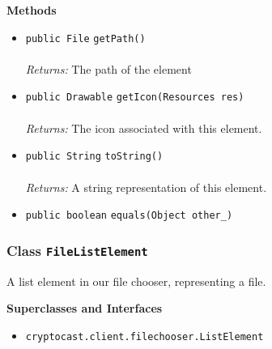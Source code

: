 \textbf{\sffamily Methods}
\begin{itemize}
\item \lstinline|public File| \lstinline|getPath|\lstinline|()|\\ \\[-0.6em]
\emph{Returns:} The path of the element



\item \lstinline|public Drawable| \lstinline|getIcon|\lstinline|(Resources res)|\\ \\[-0.6em]
\emph{Returns:} The icon associated with this element.



\item \lstinline|public String| \lstinline|toString|\lstinline|()|\\ \\[-0.6em]
\emph{Returns:} A string representation of this element.



\item \lstinline|public boolean| \lstinline|equals|\lstinline|(Object other_)| \\[-0.6em]




\end{itemize}

\subsubsection{Class \lstinline|FileListElement|}
A list element in our file chooser, representing a file. \\
\noindent\begin{minipage}[t]{5cm}
\vspace{0.3em}
\hspace*{2em}
\vspace{0.3em}
\end{minipage}



\textbf{\sffamily Superclasses and Interfaces}
\begin{itemize}
\item \lstinline|cryptocast.client.filechooser.ListElement|
\end{itemize}


